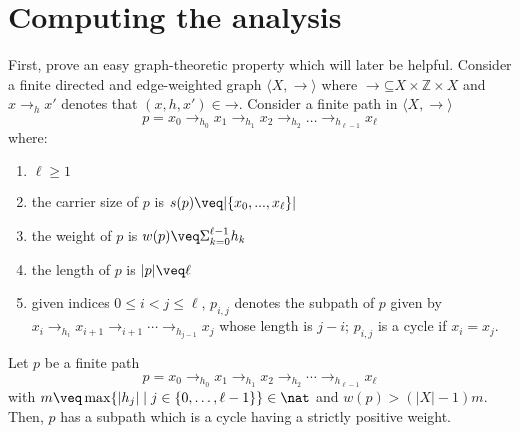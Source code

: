 \section{Computing the analysis} 
\label{sec:computing}

First, prove an easy graph-theoretic property which will later be
helpful.
Consider a finite directed and edge-weighted graph
\(\langle X,\to\rangle\) where
\(\to \mathord{\subseteq} X \times \mathbb{Z} \times X\) and
\(x \to_h x'\) denotes that \((x, h, x') \in \mathbin{\to}\). Consider
a finite path in \(\langle X,\to\rangle\)
\[p= x_0 \to_{h_0} x_1 \to_{h_1} x_2 \to_{h_2} \ldots \to_{h_{\ell-1}}
  x_{\ell}\] where:
\begin{enumerate}[label=(\roman*).]
\item \(\ell\geq 1\)
\item the carrier size of \(p\) is \(s(p) \veq |\{x_0,...,x_\ell\}|\)
\item the weight of \(p\) is \(w(p) \veq \Sigma_{k=0}^{\ell-1} h_k\)
\item the length of \(p\) is \(|p|\veq \ell\)
\item given indices \(0 \leq i < j \leq \ell\), \(p_{i,j}\) denotes
  the subpath of \(p\) given by
  \(x_i \to_{h_i} x_{i+1} \to_{i+1} \cdots \to_{h_{j-1}} x_j\) whose
  length is \(j-i\); \(p_{i,j}\) is a cycle if \(x_i=x_j\).
\end{enumerate}


\begin{lemma}
  \label{le:cycles}
  Let \(p\) be a finite path
  \[p = x_0 \to_{h_0} x_1 \to_{h_1} x_2 \to_{h_2} \cdots \to_{h_{\ell-1}} x_{\ell}\]
  with
  \(m \veq \max \{ |h_j| \mid j \in \{0, \ldots, \ell-1\}\}\in \nat\) and 
  \(w(p) > (|X|-1)m\). Then, \(p\) has a subpath which is a cycle having a 
  strictly positive weight.
\end{lemma}


